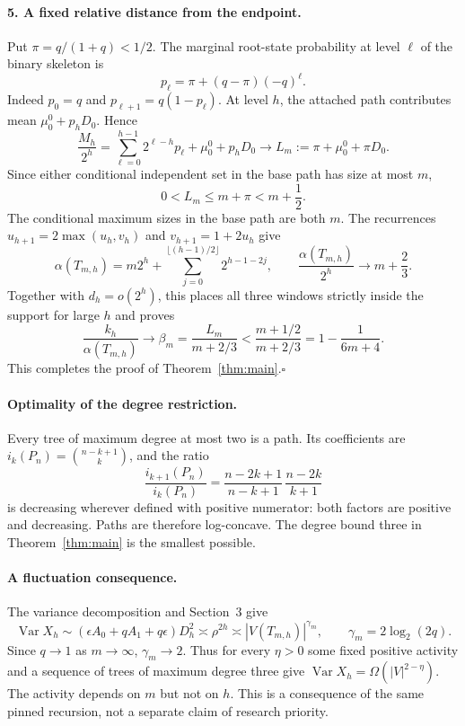 \documentclass[11pt]{article}
\newcommand{\Var}{\operatorname{Var}}
\begin{document}
\paragraph{5. A fixed relative distance from the endpoint.}
Put $\pi=q/(1+q)<1/2$. The marginal root-state probability at level $\ell$ of the binary skeleton is
\[
 p_\ell=\pi+(q-\pi)(-q)^\ell.
\]
Indeed $p_0=q$ and $p_{\ell+1}=q(1-p_\ell)$. At level $h$, the attached path contributes mean $\mu_0^0+p_hD_0$. Hence
\begin{equation}\label{eq:meanlocation}
 \frac{M_h}{2^h}
 =\sum_{\ell=0}^{h-1}2^{\ell-h}p_\ell+\mu_0^0+p_hD_0
 \longrightarrow L_m:=\pi+\mu_0^0+\pi D_0.
\end{equation}
Since either conditional independent set in the base path has size at most $m$,
\[
 0<L_m\le m+\pi<m+\frac12.
\]
The conditional maximum sizes in the base path are both $m$. The recurrences
$u_{h+1}=2\max(u_h,v_h)$ and $v_{h+1}=1+2u_h$ give
\[
 \alpha(T_{m,h})=m2^h+\sum_{j=0}^{\lfloor(h-1)/2\rfloor}2^{h-1-2j},
 \qquad \frac{\alpha(T_{m,h})}{2^h}\longrightarrow m+\frac23.
\]
Together with $d_h=o(2^h)$, this places all three windows strictly inside the support for large $h$ and proves
\[
 \frac{k_h}{\alpha(T_{m,h})}\longrightarrow
 \beta_m=\frac{L_m}{m+2/3}
 <\frac{m+1/2}{m+2/3}=1-\frac1{6m+4}.
\]
This completes the proof of Theorem~\ref{thm:main}.\hfill$\square$

\paragraph{Optimality of the degree restriction.}
Every tree of maximum degree at most two is a path. Its coefficients are
$i_k(P_n)=\binom{n-k+1}{k}$, and the ratio
\[
 \frac{i_{k+1}(P_n)}{i_k(P_n)}
 =\frac{n-2k+1}{n-k+1}\,\frac{n-2k}{k+1}
\]
is decreasing wherever defined with positive numerator: both factors are positive and decreasing. Paths are therefore log-concave. The degree bound three in Theorem~\ref{thm:main} is the smallest possible.

\paragraph{A fluctuation consequence.}
The variance decomposition and Section~3 give
\[
 \Var X_h\sim (\epsilon A_0+qA_1+q\epsilon)D_h^2
 \asymp\rho^{2h}\asymp |V(T_{m,h})|^{\gamma_m},
 \qquad \gamma_m=2\log_2(2q).
\]
Since $q\to1$ as $m\to\infty$, $\gamma_m\to2$. Thus for every $\eta>0$ some fixed positive activity and a sequence of trees of maximum degree three give $\Var X_h=\Omega(|V|^{2-\eta})$. The activity depends on $m$ but not on $h$. This is a consequence of the same pinned recursion, not a separate claim of research priority.
\end{document}

